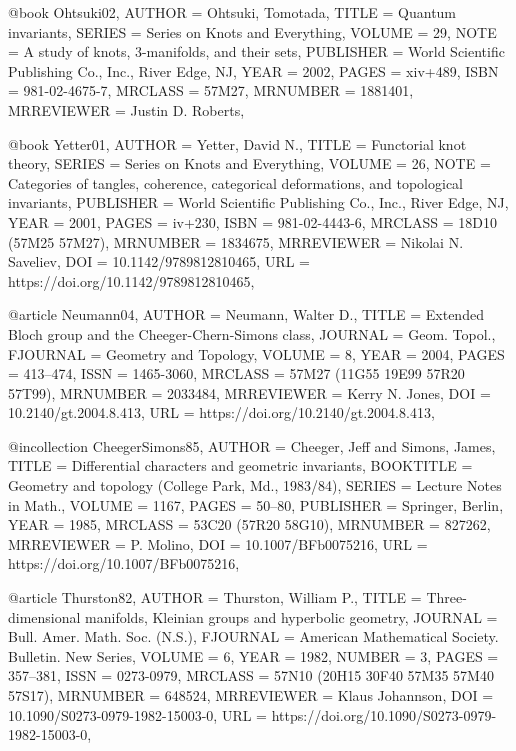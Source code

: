 @book {Ohtsuki02,
    AUTHOR = {Ohtsuki, Tomotada},
     TITLE = {Quantum invariants},
    SERIES = {Series on Knots and Everything},
    VOLUME = {29},
      NOTE = {A study of knots, 3-manifolds, and their sets},
 PUBLISHER = {World Scientific Publishing Co., Inc., River Edge, NJ},
      YEAR = {2002},
     PAGES = {xiv+489},
      ISBN = {981-02-4675-7},
   MRCLASS = {57M27},
  MRNUMBER = {1881401},
MRREVIEWER = {Justin D. Roberts},
}

@book {Yetter01,
    AUTHOR = {Yetter, David N.},
     TITLE = {Functorial knot theory},
    SERIES = {Series on Knots and Everything},
    VOLUME = {26},
      NOTE = {Categories of tangles, coherence, categorical deformations,
              and topological invariants},
 PUBLISHER = {World Scientific Publishing Co., Inc., River Edge, NJ},
      YEAR = {2001},
     PAGES = {iv+230},
      ISBN = {981-02-4443-6},
   MRCLASS = {18D10 (57M25 57M27)},
  MRNUMBER = {1834675},
MRREVIEWER = {Nikolai N. Saveliev},
       DOI = {10.1142/9789812810465},
       URL = {https://doi.org/10.1142/9789812810465},
}

@article {Neumann04,
    AUTHOR = {Neumann, Walter D.},
     TITLE = {Extended {B}loch group and the {C}heeger-{C}hern-{S}imons
              class},
   JOURNAL = {Geom. Topol.},
  FJOURNAL = {Geometry and Topology},
    VOLUME = {8},
      YEAR = {2004},
     PAGES = {413--474},
      ISSN = {1465-3060},
   MRCLASS = {57M27 (11G55 19E99 57R20 57T99)},
  MRNUMBER = {2033484},
MRREVIEWER = {Kerry N. Jones},
       DOI = {10.2140/gt.2004.8.413},
       URL = {https://doi.org/10.2140/gt.2004.8.413},
}

@incollection {CheegerSimons85,
    AUTHOR = {Cheeger, Jeff and Simons, James},
     TITLE = {Differential characters and geometric invariants},
 BOOKTITLE = {Geometry and topology ({C}ollege {P}ark, {M}d., 1983/84)},
    SERIES = {Lecture Notes in Math.},
    VOLUME = {1167},
     PAGES = {50--80},
 PUBLISHER = {Springer, Berlin},
      YEAR = {1985},
   MRCLASS = {53C20 (57R20 58G10)},
  MRNUMBER = {827262},
MRREVIEWER = {P. Molino},
       DOI = {10.1007/BFb0075216},
       URL = {https://doi.org/10.1007/BFb0075216},
}

@article {Thurston82,
    AUTHOR = {Thurston, William P.},
     TITLE = {Three-dimensional manifolds, {K}leinian groups and hyperbolic
              geometry},
   JOURNAL = {Bull. Amer. Math. Soc. (N.S.)},
  FJOURNAL = {American Mathematical Society. Bulletin. New Series},
    VOLUME = {6},
      YEAR = {1982},
    NUMBER = {3},
     PAGES = {357--381},
      ISSN = {0273-0979},
   MRCLASS = {57N10 (20H15 30F40 57M35 57M40 57S17)},
  MRNUMBER = {648524},
MRREVIEWER = {Klaus Johannson},
       DOI = {10.1090/S0273-0979-1982-15003-0},
       URL = {https://doi.org/10.1090/S0273-0979-1982-15003-0},
}

